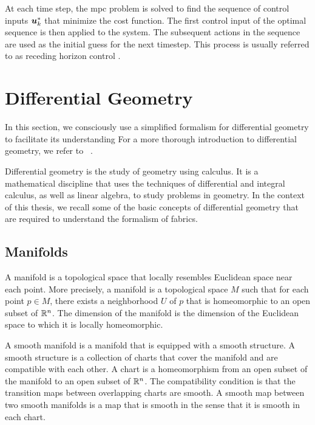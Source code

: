 At each time step, the \ac{mpc} problem is solved to
find the sequence of control inputs $\bm{u}_k^*$ that minimize
the cost function. The first control input of the optimal
sequence is then applied to the system.
The subsequent actions in the sequence are used as the
initial guess for the next timestep. 
This process is usually referred to as
receding horizon control \cite{howard2010receding}.

\section{Differential Geometry} %
\label{sec:differential_geometry}

In this section, we consciously use a simplified formalism
for differential geometry to facilitate its understanding
For a more thorough introduction to differential
geometry, we refer to
~\cite{bullo2019geometric,lee2012smooth,boumal2023introduction,lang2012fundamentals}.

Differential geometry is the study of geometry using calculus.
It is a mathematical discipline that uses the techniques of
differential and integral calculus, as well as linear
algebra, to study problems in geometry. In the context of
this thesis, we recall some of the basic concepts of
differential geometry that are required to understand the
formalism of \acl{fabrics}.

\subsection{Manifolds} %
\label{sub:manifolds}

A manifold is a topological space that locally resembles
Euclidean space near each point. More precisely, a manifold
is a topological space $M$ such that for each point $p\in
M$, there exists a neighborhood $U$ of $p$ that is
homeomorphic to an open subset of $\mathbb{R}^n$. The dimension of
the manifold is the dimension of the Euclidean space to
which it is locally homeomorphic.

A smooth manifold is a manifold that is equipped with a
smooth structure. A smooth structure is a collection of
charts that cover the manifold and are compatible with each
other. A chart is a homeomorphism from an open subset of the
manifold to an open subset of $\mathbb{R}^n$. The compatibility
condition is that the transition maps between overlapping
charts are smooth. A smooth map between two smooth manifolds
is a map that is smooth in the sense that it is smooth in
each chart.

